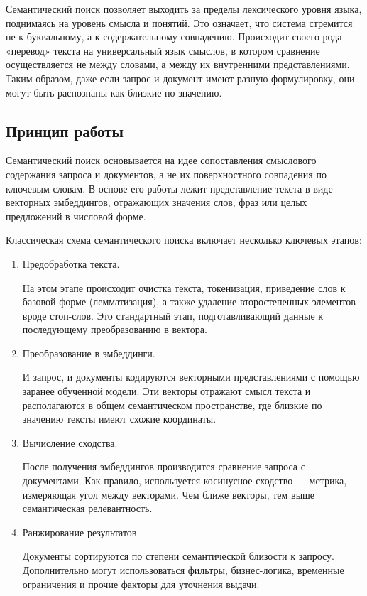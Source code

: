 \documentclass[coursework]{SCWorks}
\begin{document}
Семантический поиск позволяет выходить за пределы лексического уровня языка, поднимаясь на уровень смысла и понятий. Это означает, что система стремится не к буквальному, а к содержательному совпадению. Происходит своего рода «перевод» текста на универсальный язык смыслов, в котором сравнение осуществляется не между словами, а между их внутренними представлениями. Таким образом, даже если запрос и документ имеют разную формулировку, они могут быть распознаны как близкие по значению.

\subsection{Принцип работы}
Семантический поиск основывается на идее сопоставления смыслового содержания запроса и документов, а не их поверхностного совпадения по ключевым словам. В основе его работы лежит представление текста в виде векторных эмбеддингов, отражающих значения слов, фраз или целых предложений в числовой форме.

Классическая схема семантического поиска включает несколько ключевых этапов:
\begin{enumerate}
    \item Предобработка текста.
    
На этом этапе происходит очистка текста, токенизация, приведение слов к базовой форме (лемматизация), а также удаление второстепенных элементов вроде стоп-слов. Это стандартный этап, подготавливающий данные к последующему преобразованию в вектора.

    \item Преобразование в эмбеддинги.
    
И запрос, и документы кодируются векторными представлениями с помощью заранее обученной модели. Эти векторы отражают смысл текста и располагаются в общем семантическом пространстве, где близкие по значению тексты имеют схожие координаты.

    \item Вычисление сходства.
    
После получения эмбеддингов производится сравнение запроса с документами. Как правило, используется косинусное сходство — метрика, измеряющая угол между векторами. Чем ближе векторы, тем выше семантическая релевантность.

    \item Ранжирование результатов.
    
Документы сортируются по степени семантической близости к запросу. Дополнительно могут использоваться фильтры, бизнес-логика, временные ограничения и прочие факторы для уточнения выдачи.
\end{enumerate}
\end{document}
